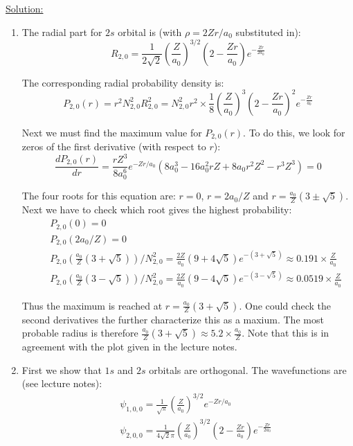 \noindent
\underline{Solution:}\\

\begin{enumerate}
\item The radial part for $2s$ orbital is (with $\rho = 2Zr/a_0$ substituted in):
$$R_{2,0} = \frac{1}{2\sqrt{2}}\left(\frac{Z}{a_0}\right)^{3/2}\left(2 - \frac{Zr}{a_0}\right)e^{-\frac{Zr}{2a_0}}$$

The corresponding radial probability density is:
$$P_{2,0}(r) = r^2N^2_{2,0}R^2_{2,0} = N^2_{2,0}r^2\times\frac{1}{8}\left(\frac{Z}{a_0}\right)^3\left(2 - \frac{Zr}{a_0}\right)^2e^{-\frac{Zr}{a_0}}$$

Next we must find the maximum value for $P_{2,0}(r)$. To do this, we look for zeros of the first derivative (with respect to $r$):
$$\frac{dP_{2,0}(r)}{dr} = \frac{rZ^3}{8a_0^6}e^{-Zr/a_0}\left(8a_0^3 - 16a_0^2rZ + 8a_0r^2Z^2 - r^3Z^3\right) = 0$$

The four roots for this equation are: $r = 0$, $r = 2a_0/Z$ and $r = \frac{a_0}{Z}\left(3 \pm \sqrt{5}\right)$. Next we have to check which root gives the highest probability:
\begin{eqnarray}
\nonumber
& & P_{2,0}(0) = 0\\
\nonumber
& & P_{2,0}(2a_0/Z) = 0\\
\nonumber
& & P_{2,0}\left(\frac{a_0}{Z}\left(3 + \sqrt{5}\right)\right)/N_{2,0}^2 = \frac{2Z}{a_0}\left(9 + 4\sqrt{5}\right)e^{-(3 + \sqrt{5})}\approx 0.191\times \frac{Z}{a_0}\\
\nonumber
& & P_{2,0}\left(\frac{a_0}{Z}\left(3 - \sqrt{5}\right)\right)/N_{2,0}^2 = \frac{2Z}{a_0}\left(9 - 4\sqrt{5}\right)e^{-(3 - \sqrt{5})}\approx 0.0519\times \frac{Z}{a_0}
\end{eqnarray}

Thus the maximum is reached at $r = \frac{a_0}{Z}\left(3 + \sqrt{5}\right)$. One could check the second derivatives the further characterize this as a maxium. The most probable radius is therefore $\frac{a_0}{Z}\left(3 + \sqrt{5}\right)\approx 5.2\times\frac{a_0}{Z}$. Note that this is in agreement with the plot given in the lecture notes.

\item First we show that $1s$ and $2s$ orbitals are orthogonal. The wavefunctions are (see lecture notes):
\begin{eqnarray}
\nonumber
& & \psi_{1,0,0} = \frac{1}{\sqrt{\pi}}\left(\frac{Z}{a_0}\right)^{3/2}e^{-Zr/a_0}\\
\nonumber
& & \psi_{2,0,0} = \frac{1}{4\sqrt{2}\pi}\left(\frac{Z}{a_0}\right)^{3/2}\left(2 - \frac{Zr}{a_0}\right)e^{-\frac{Zr}{2a_0}}
\end{eqnarray}


\end{enumerate}
